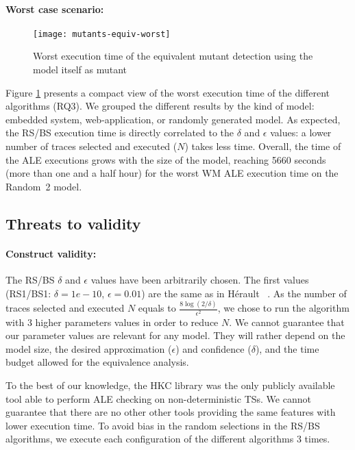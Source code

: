 \paragraph{Worst case scenario:}

\begin{figure}[t]
	\centering
	\texttt{[image: mutants-equiv-worst]}
	\caption{Worst execution time of the equivalent mutant detection using the model itself as mutant}
	\label{fig:assessment:mutantsequivworst}
\end{figure}

Figure \ref{fig:assessment:mutantsequivworst} presents a compact view of the worst execution time of the different algorithms (RQ3). We grouped the different results by the kind of model: embedded system, web-application, or randomly generated model. As expected, the RS/BS execution time is directly correlated to the $\delta$ and $\epsilon$ values: a lower number of traces selected and executed ($N$) takes less time. Overall, the time of the ALE executions grows with the size of the model, reaching 5660 seconds (more than one and a half hour) for the worst WM ALE execution time on the Random~2 model.

\subsection{Threats to validity}

\paragraph{Construct validity:}

The RS/BS $\delta$ and $\epsilon$ values have been arbitrarily chosen. The first values (RS1/BS1: $\delta=1e-10$, $\epsilon=0.01$) are the same as in H\'erault \etal~\cite{Herault2004}. As the number of traces selected and executed $N$ equals to $\frac{8\log(2/\delta)}{\epsilon^2}$, we chose to run the algorithm with 3 higher parameters values in order to reduce $N$. We cannot guarantee that our parameter values are relevant for any model. They will rather depend on the model size, the desired approximation ($\epsilon$) and confidence ($\delta$), and the time budget allowed for the equivalence analysis.

To the best of our knowledge, the HKC library \cite{hkc} was the only publicly available tool able to perform ALE checking on non-deterministic TSs. We cannot guarantee that there are no other other tools providing the same features with lower execution time. 
To avoid bias in the random selections in the RS/BS algorithms, we execute each configuration of the different algorithms 3 times.

